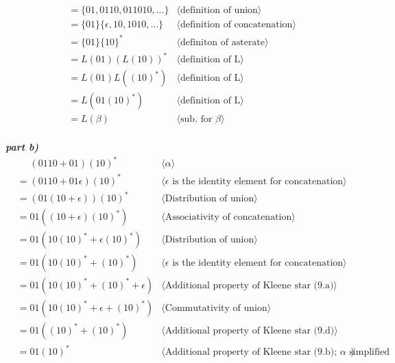 \documentclass[11pt,fleqn]{article}
\newcommand{\pnote}[1]{{\langle \text{#1} \rangle}}
\begin{document}
\begin{align*}
    &= \{01, 0110, 011010,...\} & \pnote{definition of union}\\
    &= \{01\}\{\epsilon, 10, 1010,...\} & \pnote{definition of concatenation}\\
    &= \{01\}\{10\}^* & \pnote{definiton of asterate}\\
    &= L(01)(L(10))^* & \pnote{definition of L}\\
    &= L(01)L((10)^*) & \pnote{definition of L}\\
    &= L(01(10)^*) & \pnote{definition of L}\\
    &= L(\beta) & \pnote{sub. for $\beta$}\\
\end{align*}


\textbf{\emph{part b)}}
\begin{align*}
    &\phantom{{}=} (0110+01)(10)^* & \pnote{$\alpha$}\\
    &= (0110+01\epsilon)(10)^* & \pnote{$\epsilon$ is the identity element for concatenation}\\
    &= (01(10+\epsilon))(10)^* & \pnote{Distribution of union}\\
    &= 01((10+\epsilon)(10)^*) & \pnote{Associativity of concatenation}\\
    &= 01(10(10)^*+\epsilon(10)^*) & \pnote{Distribution of union}\\
    &= 01(10(10)^*+(10)^*) & \pnote{$\epsilon$ is the identity element for concatenation}\\
    &= 01(10(10)^*+(10)^*+\epsilon) & \pnote{Additional property of Kleene star (9.a)}\\
    &= 01(10(10)^*+\epsilon+(10)^*) & \pnote{Commutativity of union}\\
    &= 01((10)^*+(10)^*) & \pnote{Additional property of Kleene star (9.d)}\\
    &= 01(10)^* & \pnote{Additional property of Kleene star (9.b); $\alpha$ simplified}\\
\end{align*}
\end{document}
